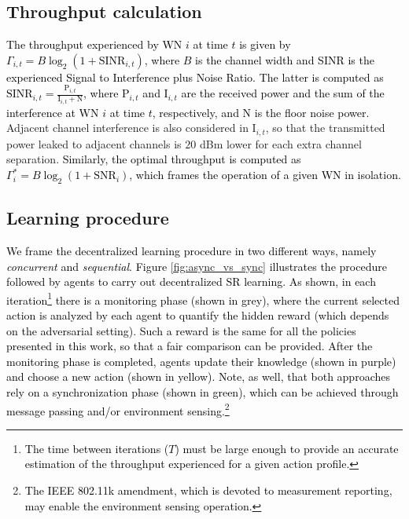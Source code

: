 \documentclass{article}
\begin{document}
	\subsection{Throughput calculation}
	\label{section:throughput_calculation}
	\textcolor{black}{The throughput experienced by WN $i$ at time $t$ is given by $\Gamma_{i,t} = B  \log_{2}(1 + \text{SINR}_{i, t})$,
		where $B$ is the channel width and SINR is the experienced Signal to Interference plus Noise Ratio. The latter is computed as $\text{SINR}_{i,t} = \frac{\text{P}_{i,t}}{\text{I}_{i,t}+\text{N}}$,
		where $\text{P}_{i,t}$ and $\text{I}_{i,t}$ are the received power and the sum of the interference at WN $i$ at time $t$, respectively, and N is the floor noise power.} Adjacent channel interference is also considered in $\text{I}_{i,t}$, so that the transmitted power leaked to adjacent channels is $20$ dBm lower for each extra channel separation. \textcolor{black}{Similarly, the optimal throughput is computed as $\Gamma_{i}^* = B  \log_{2}(1 + \text{SNR}_{i})$, which frames the operation of a given WN in isolation.}
	
	\subsection{Learning procedure}
	\label{section:learning_procedure}
	
	\textcolor{black}{We frame the decentralized learning procedure in two different ways, namely \textit{concurrent} and \textit{sequential}. Figure \ref{fig:async_vs_sync} illustrates the procedure followed by agents to carry out decentralized SR learning. As shown, in each iteration\footnote{\textcolor{black}{The time between iterations ($T$) must be large enough to provide an accurate estimation of the throughput experienced for a given action profile.}} there is a monitoring phase (shown in grey), where the current selected action is analyzed by each agent to quantify the hidden reward (which depends on the adversarial setting). Such a reward is the same for all the policies presented in this work, so that a fair comparison can be provided. After the monitoring phase is completed, agents update their knowledge (shown in purple) and choose a new action (shown in yellow). Note, as well, that both approaches rely on a synchronization phase (shown in green), which can be achieved  through message passing \cite{sanghavi2009message, yang2011message} and/or environment sensing.\footnote{\textcolor{black}{The IEEE 802.11k amendment, which is devoted to measurement reporting, may enable the environment sensing operation.}}} 
	
\end{document}

